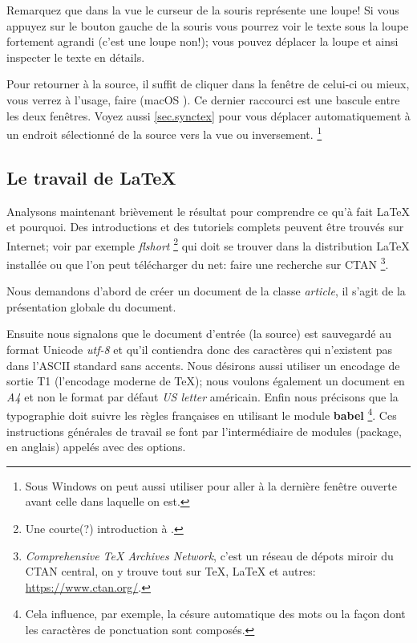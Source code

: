 Remarquez que dans la vue le curseur de la souris représente une loupe! Si vous appuyez sur le bouton gauche de la souris vous pourrez voir le texte sous la loupe fortement agrandi (c'est une loupe non!); vous pouvez déplacer la loupe et ainsi inspecter le texte en détails.

Pour retourner à la source, il suffit de cliquer dans la fenêtre de celui-ci ou mieux, vous verrez à l'usage, faire  (macOS ). Ce dernier raccourci est une bascule entre les deux fenêtres. Voyez aussi \ref{sec.synctex} pour vous déplacer automatiquement à un endroit sélectionné de la source vers la vue ou inversement. \footnote{Sous Windows on peut aussi utiliser  pour aller à la dernière fenêtre ouverte avant celle dans laquelle on est.} 

\subsection{Le travail de \LaTeX}

Analysons maintenant brièvement le résultat pour comprendre ce qu'à fait \LaTeX{} et pourquoi. Des introductions et des tutoriels complets peuvent être trouvés sur Internet; voir par exemple \emph{flshort} \footnote{Une courte(?) introduction à \LaTeXe.} qui doit se trouver dans la distribution \LaTeX{} installée ou que l'on peut télécharger du net: faire une recherche sur CTAN \footnote{\emph{Comprehensive TeX Archives Network}, c'est un réseau de dépots miroir du CTAN central, on y trouve tout sur \TeX{}, \LaTeX{} et autres: \url{https://www.ctan.org/}.}.

Nous demandons d'abord de créer un document de la classe \emph{article}, il s'agit de la présentation globale du document. 

Ensuite nous signalons que le document d'entrée (la source) est sauvegardé au format Unicode \emph{utf-8} et qu'il contiendra donc des caractères qui n'existent pas dans l'ASCII standard sans accents. Nous désirons aussi utiliser un encodage de sortie T1 (l'encodage moderne de \TeX); nous voulons également un document en \emph{A4} et non le format par défaut \emph{US letter} américain. Enfin nous précisons que la typographie doit suivre les règles françaises en utilisant le module \textbf{\textsf{babel}} \footnote{ Cela influence, par exemple, la césure automatique des mots ou la façon dont les caractères de ponctuation sont composés.}. Ces instructions générales de travail se font par l'intermédiaire de modules (package, en anglais) appelés avec des options.

